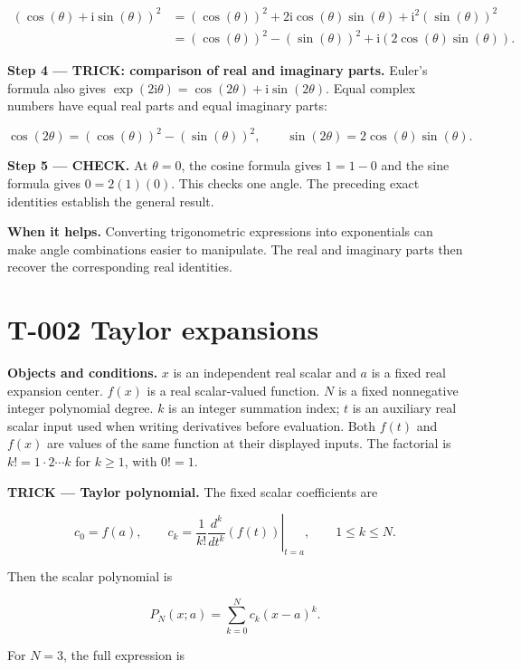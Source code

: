 \documentclass[11pt,oneside,openany]{book}
\begin{document}
\[
\begin{aligned}
\left(\cos(\theta)+\mathrm i\sin(\theta)\right)^2
&=(\cos(\theta))^2
+2\mathrm i\cos(\theta)\sin(\theta)
+\mathrm i^2(\sin(\theta))^2\\
&=(\cos(\theta))^2-(\sin(\theta))^2
+\mathrm i\left(2\cos(\theta)\sin(\theta)\right).
\end{aligned}
\]

\endgroup
\begingroup\color{TrickPurple}
\textbf{Step 4 --- TRICK: comparison of real and imaginary parts.} Euler's formula also
gives \(\exp(2\mathrm i\theta)=\cos(2\theta)+\mathrm i\sin(2\theta)\).
Equal complex numbers have equal real parts and equal imaginary parts:

\[
\cos(2\theta)=(\cos(\theta))^2-(\sin(\theta))^2,
\qquad
\sin(2\theta)=2\cos(\theta)\sin(\theta).
\]

\endgroup
\textbf{Step 5 --- CHECK.} At \(\theta=0\), the cosine formula gives \(1=1-0\) and the
sine formula gives \(0=2(1)(0)\). This checks one angle. The preceding exact
identities establish the general result.

\textbf{When it helps.} Converting trigonometric expressions into exponentials can
make angle combinations easier to manipulate. The real and imaginary parts then recover the corresponding real identities.

\section{T-002 Taylor expansions}

\textbf{Objects and conditions.} \(x\) is an independent real scalar and \(a\) is a fixed
real expansion center. \(f(x)\) is a real scalar-valued function. \(N\) is a fixed
nonnegative integer polynomial degree. \(k\) is an integer summation index;
\(t\) is an auxiliary real scalar input used when writing derivatives before
evaluation. Both \(f(t)\) and \(f(x)\) are values of the same function at their
displayed inputs. The factorial is \(k!=1\cdot2\cdots k\) for \(k\ge1\), with \(0!=1\).

\textbf{TRICK --- Taylor polynomial.} The fixed scalar coefficients are

\[
c_0=f(a),\qquad
c_k=\frac1{k!}\left.\frac{d^k}{dt^k}\left(f(t)\right)\right|_{t=a},
\qquad 1\leq k\leq N.
\]

Then the scalar polynomial is

\[
P_N(x;a)=\sum_{k=0}^{N}c_k(x-a)^k.
\]

For \(N=3\), the full expression is
\end{document}
